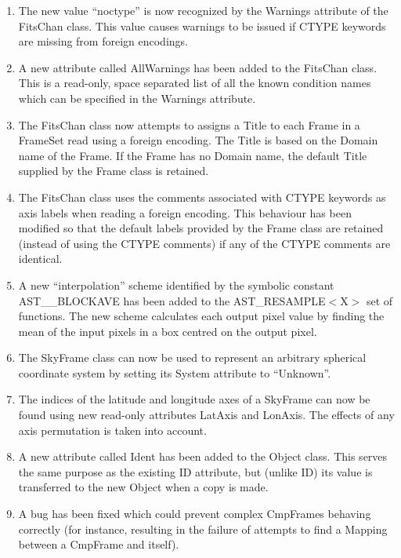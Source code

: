\documentclass[twoside,11pt]{article}
\begin{document}
\begin{enumerate}
\item The new value ``noctype'' is now recognized by the Warnings attribute
of the FitsChan class. This value causes warnings to be issued if CTYPE
keywords are missing from foreign encodings.

\item A new attribute called AllWarnings has been added to the FitsChan
class. This is a read-only, space separated list of all the known condition
names which can be specified in the Warnings attribute.

\item The FitsChan class now attempts to assigns a Title to each Frame in
a FrameSet read using a foreign encoding. The Title is based on the Domain
name of the Frame. If the Frame has no Domain name, the default Title
supplied by the Frame class is retained.

\item The FitsChan class uses the comments associated with CTYPE
keywords as axis labels when reading a foreign encoding. This behaviour
has been modified so that the default labels provided by the Frame class
are retained (instead of using the CTYPE comments) if any of the CTYPE
comments are identical.

\item A new ``interpolation'' scheme identified by the symbolic constant
AST\_\_BLOCKAVE has been added to the AST\_RESAMPLE$<$X$>$ set of
functions. The new scheme calculates each output pixel value by finding
the mean of the input pixels in a box centred on the output pixel.

\item The SkyFrame class can now be used to represent an arbitrary spherical
coordinate system by setting its System attribute to ``Unknown''.

\item The indices of the latitude and longitude axes of a SkyFrame can
now be found using new read-only attributes LatAxis and LonAxis. The
effects of any axis permutation is taken into account.

\item A new attribute called Ident has been added to the Object class.
This serves the same purpose as the existing ID attribute, but (unlike ID)
its value is transferred to the new Object when a copy is made.

\item A bug has been fixed which could prevent complex CmpFrames
behaving correctly (for instance, resulting in the failure of attempts
to find a Mapping between a CmpFrame and itself).

\end{enumerate}
\end{document}
